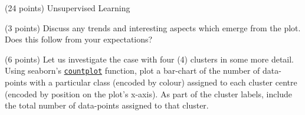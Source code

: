\documentclass[12pt]{article}
\begin{document}
\begin{question}{\label{Q_UNSUP_LEARN}(24 points) Unsupervised Learning}
\begin{subquestion}
\end{subquestion}

\begin{subquestion}{(3 points) Discuss any trends and interesting aspects which emerge from the plot. Does this follow from your expectations?}






\end{subquestion}

\begin{subquestion}{\label{Q_CLUSTER_FOUR}(6 points) Let us investigate the case with four (4) clusters in some more detail. Using seaborn's \href{https://seaborn.pydata.org/generated/seaborn.countplot.html}{\texttt{countplot}} function, plot a bar-chart of the number of data-points with a particular class (encoded by colour) assigned to each cluster centre (encoded by position on the plot's x-axis). As part of the cluster labels, include the total number of data-points assigned to that cluster.}







\end{subquestion}
\end{question}
\end{document}
